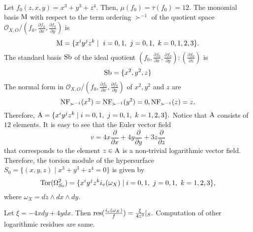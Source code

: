 \documentclass[pdftex]{arxsigma}
\begin{document}
\begin{example} 
Let $ f_0(z,x,y) = x^3+y^3+z^4. $ Then, $ \mu(f_0)=\tau(f_0)=12. $ 
The monomial basis $ {\rm M} $ with respect to the term ordering $ \succ^{-1} $ of the quotient space 
$ {\mathcal O}_{X,O}/(f_0, \frac{\partial f_0}{\partial x}, \frac{\partial f_0}{\partial y}) $ is 
\begin{equation*}
{\rm M} = \{ x^i y^j z^k \mid \  i=0,1, \ j=0,1, \ k=0,1,2,3 \}. 
\end{equation*}
The standard basis $ {\rm Sb}$ of the ideal quotient 
$ (f_0, \frac{\partial f_0}{\partial x}, \frac{\partial f_0}{\partial y}): (\frac{\partial f_0}{\partial z})  $ is 
\begin{equation*}
{\rm Sb} = \{ x^2, y^2, z \} 
\end{equation*}
The normal form in  $ {\mathcal O}_{X,O}/(f_0, \frac{\partial f_0}{\partial x}, \frac{\partial f_0}{\partial y}) $ of $ x^2, y^2$ and $ z $ are
\begin{equation*}
{\rm NF}_{\succ^{-1}}(x^2) = {\rm NF}_{\succ^{-1}}(y^2) = 0, 
 {\rm NF}_{\succ^{-1}}(z) = z. 
\end{equation*}
Therefore, 
$ {\rm A} = \{ x^iy^jz^k \mid i=0,1, \ j=0,1, \ k=1,2,3 \}. $ Notice that ${\rm A}$ consists of $12$ elements. It is easy to see that the Euler vector field 
\begin{equation*}
v= 4x\frac{\partial}{\partial x} + 4y\frac{\partial}{\partial y} +3z\frac{\partial}{\partial z} 
\end{equation*}
that corresponds to the element $ z \in {\rm A} $ is a non-trivial logarithmic vector field. Therefore, the torsion module of the hypersurface 
$ S_0 = \{ (x, y,z) \mid x^3+y^3+z^4=0 \} $ is given by 
\begin{equation*}
{\rm Tor}(\Omega_{S_0}^2) = \{ x^iy^jz^k i_v(\omega_X) \mid i=0,1, \ j=0,1, \ k=1,2,3 \}, 
\end{equation*}
where $ \omega_X = dz \wedge dx \wedge dy. $ 

Let $ \xi = -4xdy+4ydx. $ Then $ {\rm res}(\frac{i_v(\omega_X)}{f}) = \frac{\xi}{4z^3}|_S. $ Computation of other logarithmic residues are same. 
\end{example}
\end{document}
